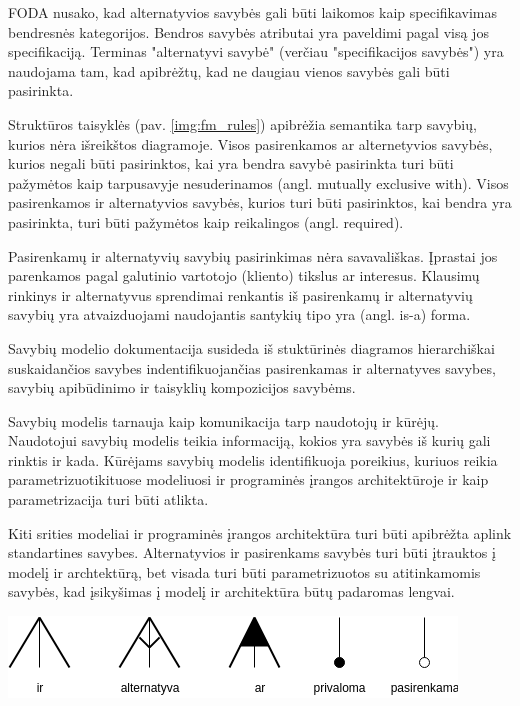 \documentclass{VUMIFPSkursinis}
\begin{document}
FODA \cite{Kang1990} nusako, kad alternatyvios savybės gali būti laikomos kaip specifikavimas bendresnės kategorijos. Bendros savybės atributai yra paveldimi pagal visą jos specifikaciją. Terminas "alternatyvi savybė" (verčiau "specifikacijos savybės") yra naudojama tam, kad apibrėžtų, kad ne daugiau vienos savybės gali būti pasirinkta. 

Struktūros taisyklės (pav. \ref{img:fm_rules}) apibrėžia semantika tarp savybių, kurios nėra išreikštos diagramoje. Visos pasirenkamos ar alternetyvios savybės, kurios negali būti pasirinktos, kai yra bendra savybė pasirinkta turi būti pažymėtos kaip tarpusavyje nesuderinamos (angl. mutually exclusive with). Visos pasirenkamos ir alternatyvios savybės, kurios turi būti pasirinktos, kai bendra yra pasirinkta, turi būti pažymėtos kaip reikalingos (angl. required).

Pasirenkamų ir alternatyvių savybių pasirinkimas nėra savavališkas. Įprastai jos parenkamos pagal galutinio vartotojo (kliento) tikslus ar interesus. Klausimų rinkinys ir alternatyvus sprendimai renkantis iš pasirenkamų ir alternatyvių savybių yra atvaizduojami naudojantis santykių tipo yra (angl. is-a) forma.

Savybių modelio dokumentacija susideda iš stuktūrinės diagramos hierarchiškai suskaidančios savybes indentifikuojančias pasirenkamas ir alternatyves savybes, savybių apibūdinimo ir taisyklių kompozicijos savybėms. 

Savybių modelis tarnauja kaip komunikacija tarp naudotojų ir kūrėjų. Naudotojui savybių modelis teikia informaciją, kokios yra savybės iš kurių gali rinktis ir kada. Kūrėjams savybių modelis identifikuoja poreikius, kuriuos reikia parametrizuotikituose modeliuosi ir programinės įrangos architektūroje ir kaip parametrizacija turi būti atlikta.

Kiti srities modeliai ir programinės įrangos architektūra turi būti apibrėžta aplink standartines savybes. Alternatyvios ir pasirenkams savybės turi būti įtrauktos į modelį ir archtektūrą, bet visada turi būti parametrizuotos su atitinkamomis savybės, kad įsikyšimas į modelį ir architektūra būtų padaromas lengvai. 

\begin{center}
    \includegraphics[scale=0.75]{img/feature_model_rules}
    \label{img:fm_rules}
\end{center}
\end{document}
